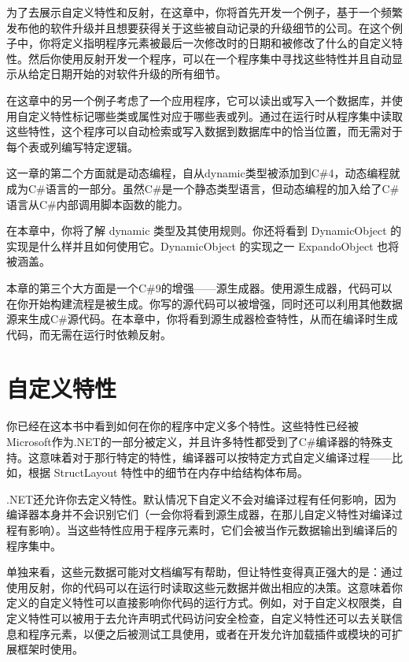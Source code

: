 为了去展示自定义特性和反射，在这章中，你将首先开发一个例子，基于一个频繁发布他的软件升级并且想要获得关于这些被自动记录的升级细节的公司。在这个例子中，你将定义指明程序元素被最后一次修改时的日期和被修改了什么的自定义特性。然后你使用反射开发一个程序，可以在一个程序集中寻找这些特性并且自动显示从给定日期开始的对软件升级的所有细节。

在这章中的另一个例子考虑了一个应用程序，它可以读出或写入一个数据库，并使用自定义特性标记哪些类或属性对应于哪些表或列。通过在运行时从程序集中读取这些特性，这个程序可以自动检索或写入数据到数据库中的恰当位置，而无需对于每个表或列编写特定逻辑。

这一章的第二个方面就是动态编程，自从dynamic类型被添加到C\#4，动态编程就成为C\#语言的一部分。虽然C\#是一个静态类型语言，但动态编程的加入给了C\#语言从C\#内部调用脚本函数的能力。

在本章中，你将了解 dynamic 类型及其使用规则。你还将看到 DynamicObject 的实现是什么样并且如何使用它。DynamicObject 的实现之一 ExpandoObject 也将被涵盖。

本章的第三个大方面是一个C\#9的增强——源生成器。使用源生成器，代码可以在你开始构建流程是被生成。你写的源代码可以被增强，同时还可以利用其他数据源来生成C\#源代码。在本章中，你将看到源生成器检查特性，从而在编译时生成代码，而无需在运行时依赖反射。

\section{自定义特性}
你已经在这本书中看到如何在你的程序中定义多个特性。这些特性已经被Microsoft作为.NET的一部分被定义，并且许多特性都受到了C\#编译器的特殊支持。这意味着对于那行特定的特性，编译器可以按特定方式自定义编译过程——比如，根据 StructLayout 特性中的细节在内存中给结构体布局。

.NET还允许你去定义特性。默认情况下自定义不会对编译过程有任何影响，因为编译器本身并不会识别它们（一会你将看到源生成器，在那儿自定义特性对编译过程有影响）。当这些特性应用于程序元素时，它们会被当作元数据输出到编译后的程序集中。

单独来看，这些元数据可能对文档编写有帮助，但让特性变得真正强大的是：通过使用反射，你的代码可以在运行时读取这些元数据并做出相应的决策。这意味着你定义的自定义特性可以直接影响你代码的运行方式。例如，对于自定义权限类，自定义特性可以被用于去允许声明式代码访问安全检查，自定义特性还可以去关联信息和程序元素，以便之后被测试工具使用，或者在开发允许加载插件或模块的可扩展框架时使用。

